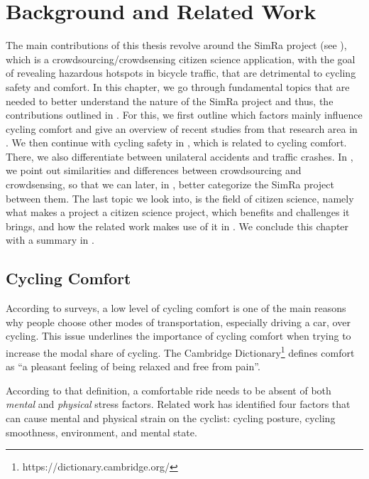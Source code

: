\cleardoublepage
\chapter{Background and Related Work}
\label{cha:background}
The main contributions of this thesis revolve around the SimRa project (see ), which is a crowdsourcing/crowdsensing citizen science application, with the goal of revealing hazardous hotspots in bicycle traffic, that are detrimental to cycling safety and comfort.
In this chapter, we go through fundamental topics that are needed to better understand the nature of the SimRa project and thus, the contributions outlined in .
For this, we first outline which factors mainly influence cycling comfort and give an overview of recent studies from that research area in .
We then continue with cycling safety in , which is related to cycling comfort.
There, we also differentiate between unilateral accidents and traffic crashes.
In , we point out similarities and differences between crowdsourcing and crowdsensing, so that we can later, in , better categorize the SimRa project between them.
The last topic we look into, is the field of citizen science, namely what makes a project a citizen science project, which benefits and challenges it brings, and how the related work makes use of it in .
We conclude this chapter with a summary in .

\section{Cycling Comfort}
\label{sec:cycling_comfort_background}
According to surveys, a low level of cycling comfort is one of the main reasons why people choose other modes of transportation, especially driving a car, over cycling.
This issue underlines the importance of cycling comfort when trying to increase the modal share of cycling.
The Cambridge Dictionary\footnote{https://dictionary.cambridge.org/} defines comfort as
``a pleasant feeling of being relaxed and free from pain''.

According to that definition, a comfortable ride needs to be absent of both \textit{mental} and \textit{physical} stress factors.
Related work has identified four factors that can cause mental and physical strain on the cyclist: cycling posture, cycling smoothness, environment, and mental state.

